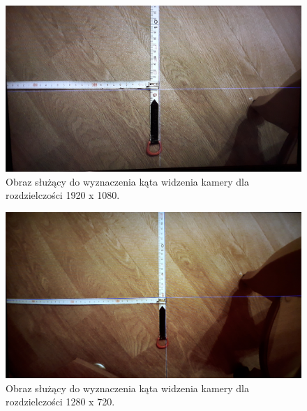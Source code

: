 \begin{figure}[h]
	\centering
	\includegraphics[width=\textwidth]{1080p.jpg}
	\caption{Obraz służący do wyznaczenia kąta widzenia kamery dla rozdzielczości 1920 x 1080.}
	\label{fig:1080p}
\end{figure}
\begin{figure}[h]
	\centering
	\includegraphics[width=\textwidth]{720p.jpg}
	\caption{Obraz służący do wyznaczenia kąta widzenia kamery dla rozdzielczości 1280 x 720.}
	\label{fig:720p}
\end{figure}

